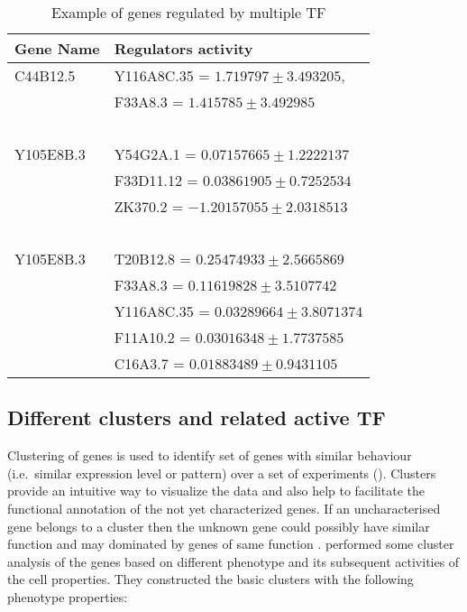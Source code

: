 \begin{table}
	\centering
\begin{tabular}{l l }
      \toprule
      \textbf{Gene Name} & \textbf{Regulators activity} \\
      \midrule
	      C44B12.5 & Y116A8C.35 = $ 1.719797 \pm 3.493205 $, \\ 
		       & F33A8.3 = $ 1.415785 \pm 3.492985$ \\~\\

	      Y105E8B.3 & Y54G2A.1 = $ 0.07157665 \pm 1.2222137 $ \\
			& F33D11.12 = $ 0.03861905 \pm 0.7252534 $ \\
			& ZK370.2 = $ -1.20157055 \pm  2.0318513 $\\~\\
		    
	      Y105E8B.3 & T20B12.8 = $ 0.25474933 \pm  2.5665869 $ \\
		  	& F33A8.3 = $ 0.11619828  \pm  3.5107742 $ \\
 		  	& Y116A8C.35 = $ 0.03289664 \pm  3.8071374 $ \\
			& F11A10.2 = $ 0.03016348 \pm 1.7737585 $ \\
 		  	& C16A3.7 = $ 0.01883489 \pm  0.9431105$\\
  \bottomrule
  \end{tabular}
	  \caption[Example of genes regulated by multiple TF]
		  {Example of genes regulated by multiple TF}
	  \label{table:Genes_regulated_by_multiple_TF}
\end{table}

\subsection{Different clusters and related active TF}
Clustering of genes is used to identify set of genes with similar behaviour (i.e.\ similar expression level or pattern) over a set of experiments (\cite{Eisen:1998}). Clusters provide an intuitive way to visualize the data and also help to facilitate the functional annotation of the not yet characterized genes. If an uncharacterised gene belongs to a cluster then the unknown gene could possibly have similar function and may dominated by genes of same function \cite{Pe'er:2003}. \cite{Cossins:2007} performed some cluster analysis of the genes based on different phenotype and its subsequent activities of the cell properties. They constructed the basic clusters with the following phenotype properties:

